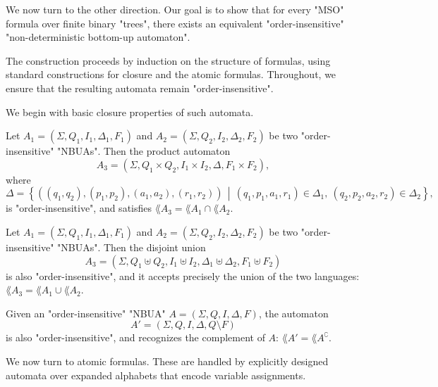 \documentclass[a4paper,UKenglish,cleveref, autoref, thm-restate]{lipics-v2021}
\begin{document}
We now turn to the other direction. Our goal is to show that for every "MSO" formula over finite binary "trees", 
there exists an equivalent "order-insensitive" "non-deterministic bottom-up automaton".

The construction proceeds by induction on the structure of formulas, using standard constructions for closure and the atomic formulas.
Throughout, we ensure that the resulting automata remain "order-insensitive".

We begin with basic closure properties of such automata.

\begin{lemma}[Intersection]\label{lem:intersection}
	Let $A_1 = (\Sigma, Q_1, I_1, \Delta_1, F_1)$ and $A_2 = (\Sigma, Q_2, I_2, \Delta_2, F_2)$ be two "order-insensitive" "NBUAs". Then the product automaton
	\[
		A_3 = (\Sigma, Q_1 \times Q_2, I_1 \times I_2, \Delta, F_1 \times F_2),
	\]
	where
	\[
		\Delta = \left\{ ((q_1,q_2), (p_1,p_2), (a_1,a_2), (r_1,r_2)) \,\middle|\, (q_1,p_1,a_1,r_1) \in \Delta_1,\ (q_2,p_2,a_2,r_2) \in \Delta_2 \right\},
	\]
	is "order-insensitive", and satisfies $\lang{A_3} = \lang{A_1} \cap \lang{A_2}$.
\end{lemma}

\begin{lemma}[Union]\label{lem:union}
	Let $A_1 = (\Sigma, Q_1, I_1, \Delta_1, F_1)$ and $A_2 = (\Sigma, Q_2, I_2, \Delta_2, F_2)$ be two "order-insensitive" "NBUAs". Then the disjoint union
	\[
		A_3 = (\Sigma, Q_1 \uplus Q_2, I_1 \uplus I_2, \Delta_1 \uplus \Delta_2, F_1 \uplus F_2)
	\]
	is also "order-insensitive", and it accepts precisely the union of the two languages: $\lang{A_3} = \lang{A_1} \cup \lang{A_2}$.
\end{lemma}

\begin{lemma}[Complement]\label{lem:complement}
	Given an "order-insensitive" "NBUA" $A = (\Sigma, Q, I, \Delta, F)$, the automaton
	\[
		A' = (\Sigma, Q, I, \Delta, Q \setminus F)
	\]
	is also "order-insensitive", and recognizes the complement of $A$: $\lang{A'} = \lang{A}^\complement$.
\end{lemma}

We now turn to atomic formulas. These are handled by explicitly designed automata over expanded alphabets that encode variable assignments.
\end{document}

